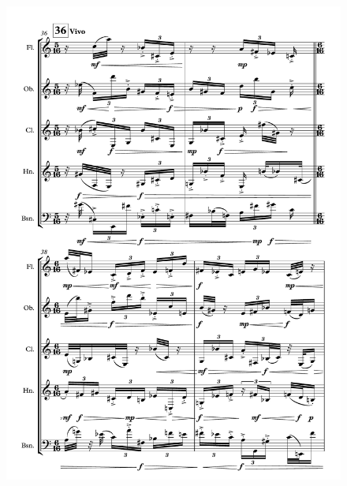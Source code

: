 \begin{figure}[H]
    \centering
	\includegraphics[width=6.5in]{figures/Out_of_Focus_7.pdf}
\end{figure}

